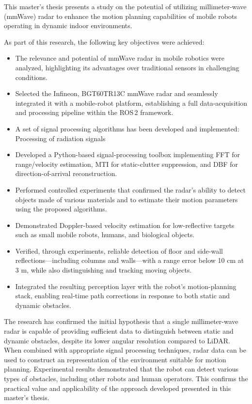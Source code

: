 This master's thesis presents a study on the potential of utilizing millimeter-wave (mmWave) radar to enhance the motion planning capabilities of mobile robots operating in dynamic indoor environments. 

\noindent
As part of this research, the following key objectives were achieved:
\begin{itemize}
    \item The relevance and potential of mmWave radar in mobile robotics were analyzed, highlighting its advantages over traditional sensors in challenging conditions.
    \item Selected the Infineon, BGT60TR13C mmWave radar and seamlessly integrated it with a mobile-robot platform, establishing a full data-acquisition and processing pipeline within the ROS\,2 framework.
    \item A set of signal processing algorithms has been developed and implemented: Processing of radiation signals
    \item Developed a Python-based signal-processing toolbox implementing FFT for range/velocity estimation, MTI for static-clutter suppression, and DBF for direction-of-arrival reconstruction.
    \item Performed controlled experiments that confirmed the radar’s ability to detect objects made of various materials and to estimate their motion parameters using the proposed algorithms.
    \item Demonstrated Doppler-based velocity estimation for low-reflective targets such as small mobile robots, humans, and biological objects.
    \item Verified, through experiments, reliable detection of floor and side-wall reflections—including columns and walls—with a range error below 10 cm at 3 m, while also distinguishing and tracking moving objects.
    \item Integrated the resulting perception layer with the robot’s motion-planning stack, enabling real-time path corrections in response to both static and dynamic obstacles.
\end{itemize}

The research has confirmed the initial hypothesis that a single millimeter-wave radar is capable of providing sufficient data to distinguish between static and dynamic obstacles, despite its lower angular resolution compared to LiDAR. When combined with appropriate signal processing techniques, radar data can be used to construct an representation of the environment suitable for motion planning. Experimental results demonstrated that the robot can detect various types of obstacles, including other robots and human operators. This confirms the practical value and applicability of the approach developed presented in this master’s thesis.

